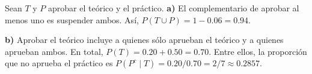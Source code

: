 Sean $T$ y $P$ aprobar el teórico y el práctico.
\textbf{a)} El complementario de aprobar al menos uno es
suspender ambos. Así, $P(T\cup P)=1-0.06=\boxed{0.94}$.

\textbf{b)} Aprobar el teórico incluye a quienes sólo aprueban
el teórico y a quienes aprueban ambos. En total,
$P(T)=0.20+0.50=0.70$. Entre ellos, la proporción que no
aprueba el práctico es
$P(P^c\mid T)=0.20/0.70=\boxed{2/7\approx0.2857}$.
